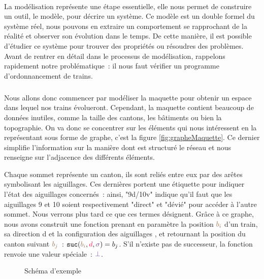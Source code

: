 \documentclass[oneside, a4paper, 11pt]{book}
\newcommand{\sucblock}{{\mathtt{suc}}}
\newcommand{\dirFmt}[1]{{\color{dircolor} #1}}
\newcommand{\posFmt}[1]{{\color{poscolor}{#1}}}
\newcommand{\bid}[1]{\ensuremath{\posFmt{b_{#1}}}}
\newcommand{\suc}[3]{\ensuremath{\sucblock(\posFmt{#1}, \dirFmt{#2}, \swFmt{#3})}}
\newcommand{\swFmt}[1]{{\color{swcolor}{#1}}}
\newcommand{\nosuc}{\ensuremath{\swFmt{\bot}}}
\begin{document}
\paragraph{} 
La modélisation représente une étape essentielle, elle nous permet de construire un outil, le modèle, pour décrire un système. Ce modèle est un double formel du système réel, nous pouvons en extraire un comportement se rapprochant de la réalité et observer son évolution dans le temps. De cette manière, il est possible d'étudier ce système pour trouver des propriétés ou résoudres des problèmes.
Avant de rentrer en détail dans le processus de modélisation, rappelons rapidement notre problématique~: il nous faut vérifier un programme d'ordonnancement de trains.

\subparagraph{}
Nous allons donc commencer par modéliser la maquette pour obtenir un espace dans lequel nos trains évolueront. Cependant, la maquette contient beaucoup de données inutiles, comme la taille des cantons, les bâtiments ou bien la topographie. On va donc se concentrer sur les éléments qui nous intéressent en la représentant sous forme de graphe, c'est la figure \ref{fig:grapheMaquette}.
Ce dernier simplifie l'information sur la manière dont est structuré le réseau et nous renseigne sur l'adjacence des différents éléments.

Chaque sommet représente un canton, ils sont reliés entre eux par des arêtes symbolisant les aiguillages. Ces dernières portent une étiquette pour indiquer l'état des aiguillages concernés~: ainsi, "9d/10v" indique qu'il faut que les aiguillages 9 et 10 soient respectivement "direct" et "dévié" pour accéder à l'autre sommet. Nous verrons plus tard ce que ces termes désignent.
Grâce à ce graphe, nous avons construit une fonction prenant en paramètre la position \bid{i} d'un train, sa direction \dirFmt{d} et la configuration des aiguillages \swFmt{$\sigma$}, et retournant la position du canton suivant \bid{j}~: $\suc{b_i}{d}{\sigma} = b_j$. S'il n'existe pas de successeur, la fonction renvoie une valeur spéciale~: $\nosuc$.


\begin{figure}[h]
	\centering
	\caption{Schéma d'exemple}
	\label{fig:exSchema}
\end{figure}
\end{document}
